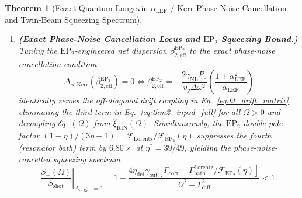 \documentclass[11pt,letterpaper]{article}
\newtheorem{theorem}{Theorem}
\theoremstyle{definition}
\theoremstyle{remark}
\begin{document}
\begin{theorem}[Exact Quantum Langevin $\alpha_{\mathrm{LEF}}$ / Kerr Phase-Noise Cancellation and Twin-Beam Squeezing Spectrum]
\begin{enumerate}
    \item[(b)] \textbf{(Exact Phase-Noise Cancellation Locus and $\mathrm{EP}_2$ Squeezing Bound.)} Tuning the $\mathrm{EP}_2$-engineered net dispersion $\beta_{2,\mathrm{eff}}^{\mathrm{EP}_2}$ to the exact phase-noise cancellation condition
    \begin{equation}
    \Delta_{\alpha,\mathrm{Kerr}}\!\left(\beta_{2,\mathrm{eff}}^{\mathrm{EP}_2}\right) = 0 \iff \beta_{2,\mathrm{eff}}^{\mathrm{EP}_2} = -\frac{2\gamma_{\mathrm{NL}}P_0}{v_g \Delta\omega^2}\left(\frac{1 + \alpha_{\mathrm{LEF}}^2}{\alpha_{\mathrm{LEF}}}\right)
    \label{eq:thm2_cancellation}
    \end{equation}
    identically zeroes the off-diagonal drift coupling in Eq.~\eqref{eq:hl_drift_matrix}, eliminating the third term in Eq.~\eqref{eq:thm2_inpsd_full} for all $\Omega > 0$ and decoupling $\delta\hat{q}_-(\Omega)$ from $\hat{\xi}_{\mathrm{RIN}}(\Omega)$. Simultaneously, the $\mathrm{EP}_2$ double-pole factor $(1 - \eta)/(3\eta - 1) = \mathcal{F}_{\mathrm{Lorentz}}/\mathcal{F}_{\mathrm{EP}_2}(\eta)$ suppresses the fourth (resonator bath) term by $6.80\times$ at $\eta^* = 39/49$, yielding the phase-noise-cancelled squeezing spectrum
    \begin{equation}
    \left.\frac{S_-(\Omega)}{S_{\mathrm{shot}}}\right|_{\Delta_{\alpha,\mathrm{Kerr}}=0} = 1 - \frac{4\eta_{\mathrm{det}}\gamma_{\mathrm{out}}\left[\Gamma_{\mathrm{corr}} - \Gamma_{\mathrm{bath}}^{\mathrm{Lorentz}}/\mathcal{F}_{\mathrm{EP}_2}(\eta)\right]}{\Omega^2 + \Gamma_{\mathrm{diff}}^2} < 1.
    \label{eq:thm2_squeezed_limit}
    \end{equation}
\end{enumerate}
\end{theorem}
\end{document}
